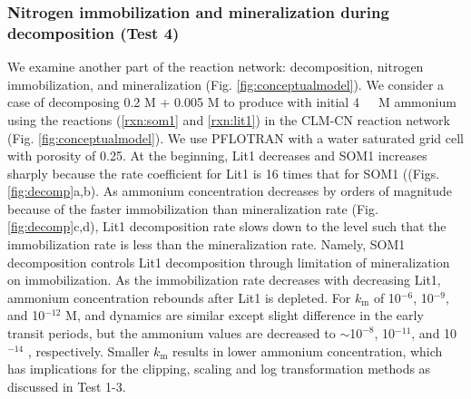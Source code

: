 \documentclass[gmd, manuscript]{copernicus}
\begin{document}
\subsubsection{Nitrogen immobilization and mineralization during decomposition (Test 4)}
We examine another part of the reaction network: decomposition, nitrogen
immobilization, and mineralization (Fig.  \ref{fig:conceptualmodel}). We
consider a case of decomposing 0.2 \unit{M}  + 0.005 \unit{M}
 to produce  with initial 4 \unit{\mu\,M} ammonium using
the reactions (\ref{rxn:som1} and \ref{rxn:lit1}) in the CLM-CN
reaction network (Fig. \ref{fig:conceptualmodel}). We use PFLOTRAN with a
water saturated grid cell with porosity of 0.25. 
At the beginning, Lit1 decreases and SOM1 increases sharply because the rate
coefficient for Lit1 is 16 times that for SOM1 ((Figs. \ref{fig:decomp}a,b). As
ammonium concentration decreases by orders of magnitude because of the faster
immobilization than mineralization rate (Fig. \ref{fig:decomp}c,d), Lit1
decomposition rate slows down to the level such  that the immobilization rate
is less than the mineralization rate. Namely, SOM1 decomposition controls Lit1
decomposition through limitation of mineralization on immobilization. As the
immobilization rate decreases with decreasing Lit1, ammonium concentration
rebounds after Lit1 is depleted. For $k_\text{m}$ of 10$^{-6}$, 10$^{-9}$, and
10$^{-12}$ M,  and  dynamics are similar except slight
difference in the early transit periods, but the ammonium values are decreased
to $\sim$1$0^{-8}$, 10$^{-11}$, and 10$^{-14}$ , respectively. Smaller
$k_\text{m}$ results in lower ammonium concentration, which has implications
for the clipping, scaling and log transformation methods as discussed in Test
1-3. 
\end{document}
